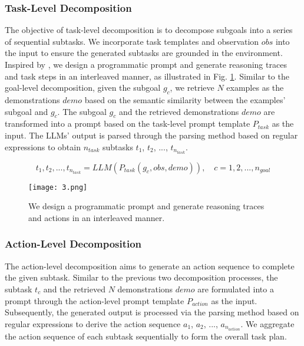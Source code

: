 \subsubsection{Task-Level Decomposition} 

The objective of task-level decomposition is to decompose subgoals into a series of sequential subtasks. We incorporate task templates and observation $obs$ into the input to ensure the generated subtasks are grounded in the environment. Inspired by \cite{DBLP:conf/icra/SinghBMGXTFTG23,DBLP:conf/iclr/YaoZYDSN023}, we design a programmatic prompt and generate reasoning traces and task steps in an interleaved manner, as illustrated in Fig. \ref{Figure 3}. Similar to the goal-level decomposition, given the subgoal $g_c$, we retrieve $N$ examples as the demonstrations $demo$ based on the semantic similarity between the examples' subgoal and $g_c$. The subgoal $g_c$ and the retrieved demonstrations $demo$ are transformed into a prompt based on the task-level prompt template $P_{task}$ as the input. The LLMs' output is parsed through the parsing method based on regular expressions to obtain $n_{task}$ subtasks $t_1$, $t_2$, ..., $t_{n_{task}}$. 

\begin{equation}
    t_1, t_2, ..., t_{n_{task}}=LLM(P_{task}(g_c, obs, demo)), \quad c=1,2, ..., n_{goal}
\end{equation}

\begin{figure}[h]
    \centering
    \texttt{[image: 3.png]}
    \caption{We design a programmatic prompt and generate reasoning traces and actions in an interleaved manner.}
    \label{Figure 3}
\end{figure}

\subsubsection{Action-Level Decomposition} 

The action-level decomposition aims to generate an action sequence to complete the given subtask. Similar to the previous two decomposition processes, the subtask $t_{c}$ and the retrieved $N$ demonstrations $demo$ are formulated into a prompt through the action-level prompt template $P_{action}$ as the input. Subsequently, the generated output is processed via the parsing method based on regular expressions to derive the action sequence $a_1$, $a_2$, ..., $a_{n_{action}}$. We aggregate the action sequence of each subtask sequentially to form the overall task plan.

